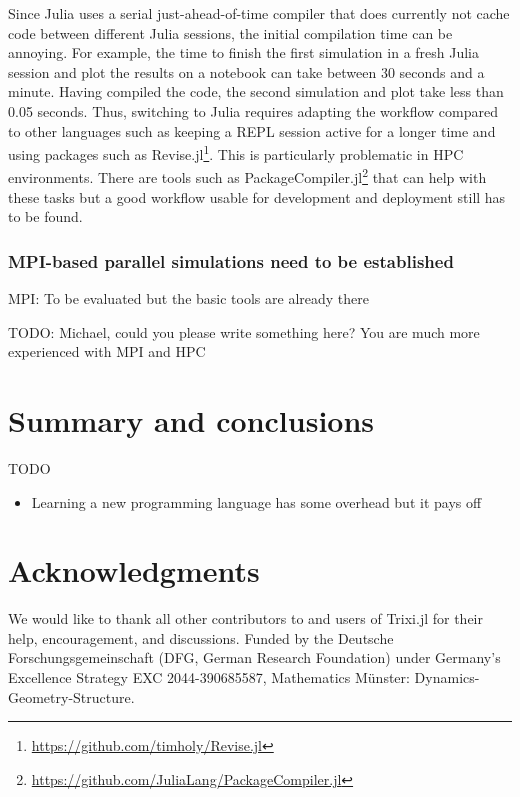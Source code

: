 \documentclass{juliacon}
\newcommand{\trixi}{Trixi.jl\xspace}
\newcommand{\todo}[1]{{\color{red}#1}}
\begin{document}
Since Julia uses a serial just-ahead-of-time compiler that does currently not cache
code between different Julia sessions, the initial compilation time can be
annoying. For example, the time to finish the first simulation in a fresh Julia
session and plot the results on a notebook can take between 30 seconds and a
minute. Having compiled the code, the second simulation and plot take less than
0.05 seconds. Thus, switching to Julia requires adapting the workflow compared
to other languages such as keeping a REPL session active for a longer time and
using packages such as Revise.jl\footnote{\url{https://github.com/timholy/Revise.jl}}.
This is particularly problematic in HPC environments. There are tools such as
PackageCompiler.jl\footnote{\url{https://github.com/JuliaLang/PackageCompiler.jl}}
that can help with these tasks but a good workflow usable for development and
deployment still has to be found.

\subsubsection{MPI-based parallel simulations need to be established}

MPI: To be evaluated but the basic tools are already there \cite{byrne2021mpi}

\todo{TODO: Michael, could you please write something here? You are much more
experienced with MPI and HPC} %


\section{Summary and conclusions}

\todo{TODO %
\begin{itemize}
  \item Learning a new programming language has some overhead but it pays off
\end{itemize}}



\section*{Acknowledgments}

We would like to thank all other contributors to and users of \trixi for their
help, encouragement, and discussions.
Funded by the Deutsche Forschungsgemeinschaft (DFG, German Research Foundation)
under Germany's Excellence Strategy EXC 2044-390685587, Mathematics Münster:
Dynamics-Geometry-Structure.
\end{document}
